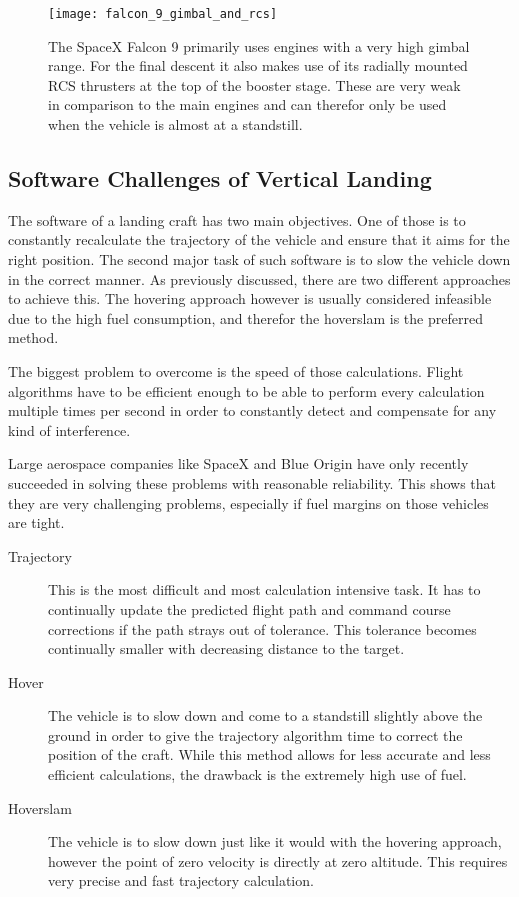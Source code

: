 \begin{figure}[H]
\centering
\texttt{[image: falcon\_9\_gimbal\_and\_rcs]}
\caption{The SpaceX Falcon 9 primarily uses engines with a very high gimbal range. For the final descent it also makes use of its radially mounted RCS thrusters at the top of the booster stage. These are very weak in comparison to the main engines and can therefor only be used when the vehicle is almost at a standstill.}
\end{figure}


\subsection{Software Challenges of Vertical Landing}

The software of a landing craft has two main objectives. One of those is to constantly recalculate the trajectory of the vehicle and ensure that it aims for the right position. The second major task of such software is to slow the vehicle down in the correct manner. 
As previously discussed, there are two different approaches to achieve this. The hovering approach however is usually considered infeasible due to the high fuel consumption, and therefor the hoverslam is the preferred method. 

The biggest problem to overcome is the speed of those calculations. Flight algorithms have to be efficient enough to be able to perform every calculation multiple times per second in order to constantly detect and compensate for any kind of interference.

Large aerospace companies like SpaceX and Blue Origin have only recently succeeded in solving these problems with reasonable reliability. This shows that they are very challenging problems, especially if fuel margins on those vehicles are tight.

\begin{description}

\item [Trajectory] This is the most difficult and most calculation intensive task. It has to continually update the predicted flight path and command course corrections if the path strays out of tolerance. This tolerance becomes continually smaller with decreasing distance to the target.

\item [Hover] The vehicle is to slow down and come to a standstill slightly above the ground in order to give the trajectory algorithm time to correct the position of the craft. While this method allows for less accurate and less efficient calculations, the drawback is the extremely high use of fuel.

\item [Hoverslam] The vehicle is to slow down just like it would with the hovering approach, however the point of zero velocity is directly at zero altitude. This requires very precise and fast trajectory calculation.

\end{description}



